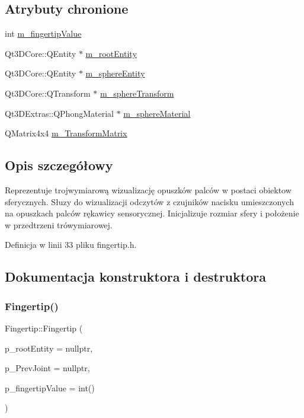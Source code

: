 \subsection*{Atrybuty chronione}
\begin{DoxyCompactItemize}
\item 
int \hyperlink{class_fingertip_a905ac81dfaa6237a3bf0bd799edee5ed}{m\+\_\+fingertip\+Value}
\item 
Qt3\+D\+Core\+::\+Q\+Entity $\ast$ \hyperlink{class_fingertip_aab2e37584c9728063525485253a8292e}{m\+\_\+root\+Entity}
\item 
Qt3\+D\+Core\+::\+Q\+Entity $\ast$ \hyperlink{class_fingertip_a48394c9bf6bbcef4e6b9fab82b561c61}{m\+\_\+sphere\+Entity}
\item 
Qt3\+D\+Core\+::\+Q\+Transform $\ast$ \hyperlink{class_fingertip_a0827f0c8eee7e8327d5ad8f74a2bc321}{m\+\_\+sphere\+Transform}
\item 
Qt3\+D\+Extras\+::\+Q\+Phong\+Material $\ast$ \hyperlink{class_fingertip_a58602637fb13017b27b8c635e614d1f5}{m\+\_\+sphere\+Material}
\item 
Q\+Matrix4x4 \hyperlink{class_fingertip_aeb9e6a84d8edba93cabbddafbcba04b2}{m\+\_\+\+Transform\+Matrix}
\end{DoxyCompactItemize}


\subsection{Opis szczegółowy}
Reprezentuje trojwymiarową wizualizację opuszków palców w postaci obiektow sferycznych. Słuzy do wizualizacji odczytów z czujników nacisku umieszczonych na opuszkach palców rękawicy sensorycznej. Inicjalizuje rozmiar sfery i położenie w przedtrzeni trówymiarowej. 

Definicja w linii 33 pliku fingertip.\+h.



\subsection{Dokumentacja konstruktora i destruktora}
\mbox{\label{class_fingertip_a532cc6d9478ba3e1e0d8024ad7773141}} 
\subsubsection{\texorpdfstring{Fingertip()}{Fingertip()}}
{\footnotesize\ttfamily Fingertip\+::\+Fingertip (\begin{DoxyParamCaption}\item[{Qt3\+D\+Core\+::\+Q\+Entity $\ast$}]{p\+\_\+root\+Entity = {\ttfamily nullptr},  }\item[{\hyperlink{class_joint}{Joint} $\ast$}]{p\+\_\+\+Prev\+Joint = {\ttfamily nullptr},  }\item[{int}]{p\+\_\+fingertip\+Value = {\ttfamily int()} }\end{DoxyParamCaption})\hspace{0.3cm}{\ttfamily [explicit]}}



